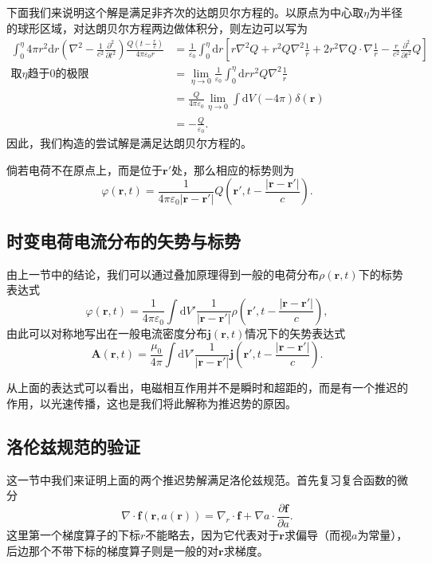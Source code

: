 \documentclass[UTF8]{ctexbook}
\renewcommand{\d}{\mathrm{d}}
\renewcommand{\b}{\boldsymbol}
\renewcommand{\k}{\frac{1}{4\pi\varepsilon_0}}
\numberwithin{equation}{chapter}
\begin{document}
	 下面我们来说明这个解是满足非齐次的达朗贝尔方程的。以原点为中心取$\eta$为半径的球形区域，对达朗贝尔方程两边做体积分，则左边可以写为
	 \begin{align*}
	 	\int_0^\eta 4\pi r^2\d r \left(\nabla^2-\frac{1}{c^2}\frac{\partial^2}{\partial t^2}\right)\frac{Q\left(t-\frac{r}{c}\right)}{4\pi\varepsilon_0r}&=\frac{1}{\varepsilon_0}\int_0^\eta \d r\left[r\nabla^2 Q+r^2Q\nabla^2\frac{1}{r}+2r^2\nabla Q\cdot\nabla \frac{1}{r}-\frac{r}{c^2}\frac{\partial^2}{\partial t^2}Q\right] \\
	 	\text{取$\eta$趋于0的极限} &= \lim_{\eta\rightarrow 0}\frac{1}{\varepsilon_0}\int_0^\eta\d r r^2Q\nabla^2\frac{1}{r} \\
	 	&=\frac{Q}{4\pi\varepsilon_0}\lim_{\eta\rightarrow 0}\int\d V(-4\pi)\delta(\b{r}) \\
	 	&=-\frac{Q}{\varepsilon_0}.
	 \end{align*}
	因此，我们构造的尝试解是满足达朗贝尔方程的。
	
	倘若电荷不在原点上，而是位于$\b{r}'$处，那么相应的标势则为
	\[\varphi(\b{r},t)=\frac{1}{4\pi\varepsilon_0|\b{r}-\b{r}'|}Q\left(\b{r}',t-\frac{|\b{r}-\b{r}'|}{c}\right).\]
	
	\subsection{时变电荷电流分布的矢势与标势}
	由上一节中的结论，我们可以通过叠加原理得到一般的电荷分布$\rho(\b{r},t)$下的标势表达式
	\[\varphi(\b{r},t)=\k\int \d V' \frac{1}{|\b{r}-\b{r}'|}\rho\left(\b{r}',t-\frac{|\b{r}-\b{r}'|}{c}\right),\]
	由此可以对称地写出在一般电流密度分布$\b{j}(\b{r},t)$情况下的矢势表达式
	\[\b{A}(\b{r},t)=\frac{\mu_0}{4\pi}\int\d V'\frac{1}{|\b{r}-\b{r}'|}\b{j}\left(\b{r}',t-\frac{|\b{r}-\b{r}'|}{c}\right).\]
	
	从上面的表达式可以看出，电磁相互作用并不是瞬时和超距的，而是有一个推迟的作用，以光速传播，这也是我们将此解称为推迟势的原因。
	
	\subsection{洛伦兹规范的验证}
	这一节中我们来证明上面的两个推迟势解满足洛伦兹规范。首先复习复合函数的微分
	\[\nabla\cdot\b{f}(\b{r},a(\b{r}))=\nabla_r\cdot \b{f}+\nabla a\cdot\frac{\partial \b{f}}{\partial a}.\]
	这里第一个梯度算子的下标$r$不能略去，因为它代表对于$\b{r}$求偏导（而视$a$为常量），后边那个不带下标的梯度算子则是一般的对$\b{r}$求梯度。
	
\end{document}
